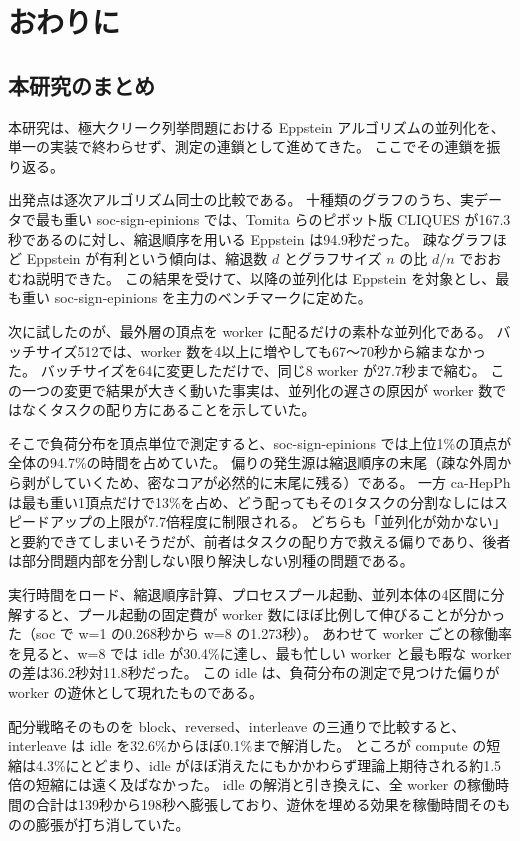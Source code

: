 \chapter{おわりに}
\label{ch:conclusion}

\section{本研究のまとめ}

本研究は、極大クリーク列挙問題における Eppstein アルゴリズムの並列化を、単一の実装で終わらせず、測定の連鎖として進めてきた。
ここでその連鎖を振り返る。

出発点は逐次アルゴリズム同士の比較である。
十種類のグラフのうち、実データで最も重い soc-sign-epinions では、Tomita らのピボット版 CLIQUES が167.3秒であるのに対し、縮退順序を用いる Eppstein は94.9秒だった。
疎なグラフほど Eppstein が有利という傾向は、縮退数 $d$ とグラフサイズ $n$ の比 $d/n$ でおおむね説明できた。
この結果を受けて、以降の並列化は Eppstein を対象とし、最も重い soc-sign-epinions を主力のベンチマークに定めた。

次に試したのが、最外層の頂点を worker に配るだけの素朴な並列化である。
バッチサイズ512では、worker 数を4以上に増やしても67〜70秒から縮まなかった。
バッチサイズを64に変更しただけで、同じ8 worker が27.7秒まで縮む。
この一つの変更で結果が大きく動いた事実は、並列化の遅さの原因が worker 数ではなくタスクの配り方にあることを示していた。

そこで負荷分布を頂点単位で測定すると、soc-sign-epinions では上位1\%の頂点が全体の94.7\%の時間を占めていた。
偏りの発生源は縮退順序の末尾（疎な外周から剥がしていくため、密なコアが必然的に末尾に残る）である。
一方 ca-HepPh は最も重い1頂点だけで13\%を占め、どう配ってもその1タスクの分割なしにはスピードアップの上限が7.7倍程度に制限される。
どちらも「並列化が効かない」と要約できてしまいそうだが、前者はタスクの配り方で救える偏りであり、後者は部分問題内部を分割しない限り解決しない別種の問題である。

実行時間をロード、縮退順序計算、プロセスプール起動、並列本体の4区間に分解すると、プール起動の固定費が worker 数にほぼ比例して伸びることが分かった（soc で w=1 の0.268秒から w=8 の1.273秒）。
あわせて worker ごとの稼働率を見ると、w=8 では idle が30.4\%に達し、最も忙しい worker と最も暇な worker の差は36.2秒対11.8秒だった。
この idle は、負荷分布の測定で見つけた偏りが worker の遊休として現れたものである。

配分戦略そのものを block、reversed、interleave の三通りで比較すると、interleave は idle を32.6\%からほぼ0.1\%まで解消した。
ところが compute の短縮は4.3\%にとどまり、idle がほぼ消えたにもかかわらず理論上期待される約1.5倍の短縮には遠く及ばなかった。
idle の解消と引き換えに、全 worker の稼働時間の合計は139秒から198秒へ膨張しており、遊休を埋める効果を稼働時間そのものの膨張が打ち消していた。

